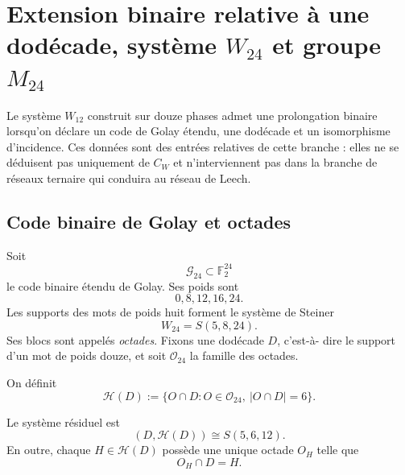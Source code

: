 
\section{Extension binaire relative à une dodécade, système \texorpdfstring{\(W_{24}\)}{W24} et groupe \texorpdfstring{\(M_{24}\)}{M24}}
\label{p12-83-c20-s3:chap:dodecada-w24-m24}

Le système \(W_{12}\) construit sur douze phases admet une prolongation
binaire lorsqu'on déclare un code de Golay étendu, une dodécade et un
isomorphisme d'incidence. Ces données sont des entrées relatives de cette branche :
elles ne se déduisent pas uniquement de \(C_W\) et n'interviennent pas dans la branche de réseaux
ternaire qui conduira au réseau de Leech.

\subsection{Code binaire de Golay et octades}

Soit
\[
 \mathcal G_{24}\subset\mathbb F_2^{24}
\]
le code binaire étendu de Golay. Ses poids sont
\begin{equation}
 0, 8, 12, 16, 24.
 \label{p12-83-c20-s3:eq:pesos-golay-binario-extendido}
\end{equation}
Les supports des mots de poids huit forment le système de Steiner
\begin{equation}
 W_{24}=S(5,8,24).
 \label{p12-83-c20-s3:eq:w24-steiner-octadas}
\end{equation}
Ses blocs sont appelés \emph{octades}. Fixons une dodécade \(D\), c'est-à-
dire le support d'un mot de poids douze, et soit \(\mathcal O_{24}\)
la famille des octades.

On définit
\begin{equation}
 \mathcal H(D)
 :=\{O\cap D:O\in\mathcal O_{24},\ |O\cap D|=6\}.
 \label{p12-83-c20-s3:eq:hexadas-residuales-dodecada}
\end{equation}

\begin{theorem}
\label{p12-83-c20-s3:thm:diseno-residual-dodecada-autonomo}
Le système résiduel est
\begin{equation}
 \boxed{(D,\mathcal H(D))\cong S(5,6,12).}
 \label{p12-83-c20-s3:eq:diseno-residual-dodecada-w12}
\end{equation}
En outre, chaque \(H\in\mathcal H(D)\) possède une unique octade \(O_H\) telle que
\begin{equation}
 O_H\cap D=H.
 \label{p12-83-c20-s3:eq:elevacion-unica-hexada-octada}
\end{equation}
\end{theorem}

